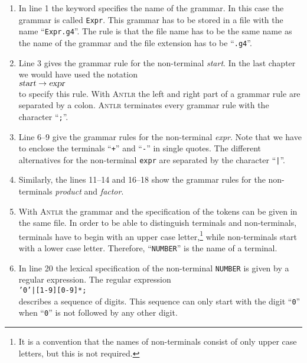 \begin{enumerate}
\item In line 1 the keyword  specifies the name of the grammar.
      In this case the grammar is called \texttt{Expr}.  This grammar has to be stored in a file with the name 
      ``\texttt{Expr.g4}''.  The rule is that the file name has to be the same name as the name of the grammar
      and the file extension has to be ``\texttt{.g4}''.  
\item Line 3 gives the grammar rule for the non-terminal \textsl{start}.  In the last chapter we would have used the
      notation \\[0.2cm]
      \hspace*{1.3cm}
      $\textsl{start} \rightarrow \textsl{expr}$
      \\[0.2cm]
      to specify this rule.  With \textsc{Antlr} the left and right part of a grammar rule are separated by a colon.
      \textsc{Antlr} terminates every grammar rule with the character ``\texttt{;}''.
\item Line 6--9 give the grammar rules for the non-terminal \textsl{expr}.  Note that we have to enclose the 
      terminals ``\texttt{+}'' and ``\texttt{-}'' in single quotes.  The different alternatives for the non-terminal
      \texttt{expr} are separated by the character ``\texttt{|}''.
\item Similarly, the lines 11--14 and 16--18 show the grammar rules for the non-terminals \textsl{product} and
      \textsl{factor}.   
\item With \textsc{Antlr} the grammar and the specification of the tokens can be given in the same file.
      In order to be able to distinguish terminals and non-terminals, terminals have to begin with an upper case 
      letter,\footnote
      {It is a convention that the names of non-terminals consist of only upper case letters, but this is not required.}
      while non-terminals start with a lower case letter.   Therefore, ``\texttt{NUMBER}'' is the name
      of a terminal.
\item In line 20 the lexical specification of the non-terminal \texttt{NUMBER} is given
      by a regular expression.  The regular expression
      \\[0.2cm]
      \hspace*{1.3cm}
      \texttt{'0'|[1-9][0-9]*;}
      \\[0.2cm]
      describes a sequence of digits.  This sequence can only start with the digit
      ``\texttt{0}'' when ``\texttt{0}'' is not followed by any other digit.


\end{enumerate}
